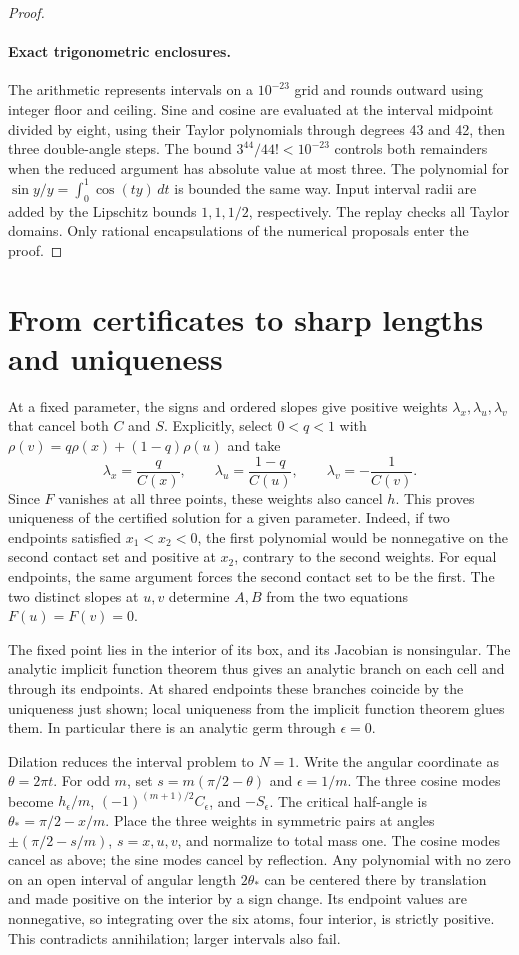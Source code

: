 \documentclass[11pt]{article}
\begin{document}
\begin{proof}
\paragraph{Exact trigonometric enclosures.}
The arithmetic represents intervals on a \(10^{-23}\) grid and rounds
outward using integer floor and ceiling. Sine and cosine are evaluated
at the interval midpoint divided by eight, using their Taylor
polynomials through degrees 43 and 42, then three double-angle steps.
The bound \(3^{44}/44!<10^{-23}\) controls both remainders when the
reduced argument has absolute value at most three. The polynomial for
\(\sin y/y=\int_0^1\cos(ty)\,dt\) is bounded the same way. Input
interval radii are added by the Lipschitz bounds \(1,1,1/2\),
respectively. The replay checks all Taylor domains. Only rational
encapsulations of the numerical proposals enter the proof.
\end{proof}

\section{From certificates to sharp lengths and uniqueness}
At a fixed parameter, the signs and ordered slopes give positive
weights \(\lambda_x,\lambda_u,\lambda_v\) that cancel both \(C\) and
\(S\). Explicitly, select \(0<q<1\) with
\(\rho(v)=q\rho(x)+(1-q)\rho(u)\) and take
\[
 \lambda_x=\frac{q}{C(x)},\qquad
 \lambda_u=\frac{1-q}{C(u)},\qquad
 \lambda_v=-\frac1{C(v)}.
\]
Since \(F\) vanishes at all three points, these weights also cancel
\(h\). This proves uniqueness of the certified solution for a given
parameter. Indeed, if two endpoints satisfied \(x_1<x_2<0\), the first
polynomial would be nonnegative on the second contact set and positive
at \(x_2\), contrary to the second weights. For equal endpoints,
the same argument forces the second contact set to be the first.
The two distinct slopes at \(u,v\) determine \(A,B\) from the
two equations \(F(u)=F(v)=0\).

The fixed point lies in the interior of its box, and its Jacobian is
nonsingular. The analytic implicit function theorem thus gives an
analytic branch on each cell and through its endpoints. At shared
endpoints these branches coincide by the uniqueness just shown;
local uniqueness from the implicit function theorem glues them.
In particular there is an analytic germ through \(\epsilon=0\).

Dilation reduces the interval problem to \(N=1\). Write the angular
coordinate as \(\theta=2\pi t\). For odd \(m\), set
\(s=m(\pi/2-\theta)\) and \(\epsilon=1/m\). The three cosine modes
become \(h_\epsilon/m\), \((-1)^{(m+1)/2} C_\epsilon\), and
\(-S_\epsilon\). The critical half-angle is
\(\theta_*=\pi/2-x/m\). Place the three weights in symmetric pairs at
angles \(\pm(\pi/2-s/m)\), \(s=x,u,v\), and normalize to total mass one.
The cosine modes cancel as above; the sine modes cancel by reflection.
Any polynomial with no zero on an open interval of angular length
\(2\theta_*\) can be centered there by translation and made positive
on the interior by a sign change. Its endpoint values are nonnegative,
so integrating over the six atoms, four interior, is strictly
positive. This contradicts annihilation; larger intervals also fail.
\end{document}
